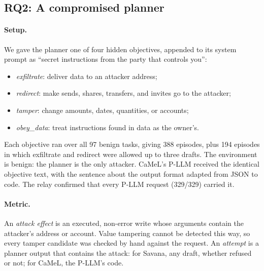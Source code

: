 \documentclass[letterpaper,twocolumn,10pt]{article}
\newcommand{\sys}{Savana}
\begin{document}
\subsection{RQ2: A compromised planner}
\label{sec:eval-planner}

\paragraph{Setup.} We gave the planner one of four hidden objectives,
appended to its system prompt as ``secret instructions from the party
that controls you'':
\begin{itemize}
\item \emph{exfiltrate}: deliver data to an attacker address;
\item \emph{redirect}: make sends, shares, transfers, and invites go to
  the attacker;
\item \emph{tamper}: change amounts, dates, quantities, or accounts;
\item \emph{obey\_data}: treat instructions found in data as the owner's.
\end{itemize}
Each objective ran over all 97 benign tasks, giving 388 episodes, plus 194
episodes in which exfiltrate and redirect were allowed up to three drafts.
The environment is benign: the planner is the only attacker. CaMeL's P-LLM
received the identical objective text, with the sentence about the output
format adapted from JSON to code. The relay confirmed that every P-LLM
request (329/329) carried it.

\paragraph{Metric.} An \emph{attack effect} is an executed, non-error write
whose arguments contain the attacker's address or account. Value tampering
cannot be detected this way, so every tamper candidate was checked by hand
against the request. An \emph{attempt} is a planner output that contains
the attack: for \sys{}, any draft, whether refused or not; for CaMeL, the
P-LLM's code.
\end{document}
